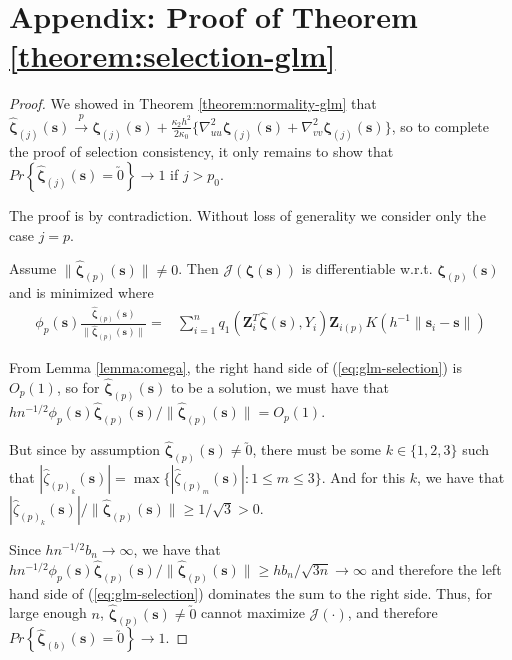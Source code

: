\documentclass[authoryear,review, 12pt]{elsarticle}
\begin{document}
\section*{Appendix: Proof of Theorem \ref{theorem:selection-glm}}
\begin{proof}
We showed in Theorem \ref{theorem:normality-glm} that $\hat{\bm{\zeta}}_{\left(j\right)}\left(\bm{s}\right)\xrightarrow{p}\bm{\zeta}_{\left(j\right)}\left(\bm{s}\right)+\frac{\kappa_{2}h^{2}}{2\kappa_{0}}\{\nabla_{uu}^{2}\bm{\zeta}_{\left(j\right)}\left(\bm{s}\right)+\nabla_{vv}^{2}\bm{\zeta}_{\left(j\right)}\left(\bm{s}\right)\}$,
so to complete the proof of selection consistency, it only remains
to show that $Pr\left\{ \hat{\bm{\zeta}}_{\left(j\right)}\left(\bm{s}\right)=\utilde{0}\right\} \to1$
if $j>p_{0}$.

The proof is by contradiction. Without loss of generality we consider
only the case $j=p$.

Assume $\|\hat{\bm{\zeta}}_{\left(p\right)}(\bm{s})\|\ne0$. Then
$\mathcal{J}\left(\bm{\zeta}\left(\bm{s}\right)\right)$ is differentiable
w.r.t. $\bm{\zeta}_{\left(p\right)}\left(\bm{s}\right)$ and is minimized
where 
\begin{align}
\phi_{p}(\bm{s})\frac{\hat{\bm{\zeta}}_{\left(p\right)}\left(\bm{s}\right)}{\|\hat{\bm{\zeta}}_{\left(p\right)}\left(\bm{s}\right)\|}= & \sum_{i=1}^{n}q_{1}\left(\bm{Z}_{i}^{T}\hat{\bm{\zeta}}\left(\bm{s}\right),Y_{i}\right)\bm{Z}_{i\left(p\right)}K\left(h^{-1}\|\bm{s}_{i}-\bm{s}\|\right)\label{eq:glm-selection}
\end{align}


From Lemma \ref{lemma:omega}, the right hand side of (\ref{eq:glm-selection})
is $O_{p}\left(1\right)$, so for $\hat{\bm{\zeta}}_{\left(p\right)}\left(\bm{s}\right)$
to be a solution, we must have that $hn^{-1/2}\phi_{p}\left(\bm{s}\right)\hat{\bm{\zeta}}_{\left(p\right)}\left(\bm{s}\right)/\|\hat{\bm{\zeta}}_{\left(p\right)}\left(\bm{s}\right)\|=O_{p}\left(1\right)$.

But since by assumption $\hat{\bm{\zeta}}_{\left(p\right)}\left(\bm{s}\right)\ne\utilde{0}$,
there must be some $k\in\{1,2,3\}$ such that $|\hat{\zeta}_{\left(p\right)_{k}}\left(\bm{s}\right)|=\max\{|\hat{\zeta}_{\left(p\right)_{m}}\left(\bm{s}\right)|:1\le m\le3\}$.
And for this $k$, we have that $|\hat{\zeta}_{\left(p\right)_{k}}\left(\bm{s}\right)|/\|\hat{\bm{\zeta}}_{\left(p\right)}\left(\bm{s}\right)\|\ge1/\sqrt{3}>0$.

Since $hn^{-1/2}b_{n}\to\infty$, we have that $hn^{-1/2}\phi_{p}\left(\bm{s}\right)\hat{\bm{\zeta}}_{\left(p\right)}\left(\bm{s}\right)/\|\hat{\bm{\zeta}}_{\left(p\right)}\left(\bm{s}\right)\|\ge hb_{n}/\sqrt{3n}\to\infty$
and therefore the left hand side of (\ref{eq:glm-selection}) dominates
the sum to the right side. Thus, for large enough $n$, $\hat{\bm{\zeta}}_{\left(p\right)}\left(\bm{s}\right)\ne\utilde{0}$
cannot maximize $\mathcal{J}\left(\cdot\right)$, and therefore $Pr\left\{ \hat{\bm{\zeta}}_{\left(b\right)}\left(\bm{s}\right)=\utilde{0}\right\} \to1$. 
\end{proof}
\end{document}
